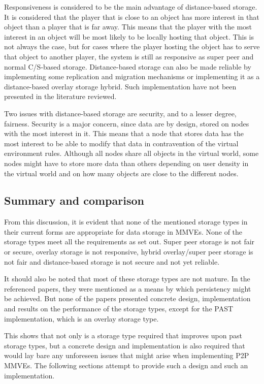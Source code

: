 \documentclass[10pt,a4paper,conference]{IEEEtran}
\begin{document}
Responsiveness is considered to be the main advantage of distance-based storage. It is considered that the player that is close to an object has more
interest in that object than a player that is far away. This means that the player with the most interest in an object will be most likely to be
locally hosting that object. This is not always the case, but for cases where the player hosting the object has to serve that object to another
player, the system is still as responsive as super peer and normal C/S-based storage. Distance-based storage can also be made reliable by
implementing some replication and migration mechanisms or implementing it as a distance-based overlay storage hybrid. Such implementation have not
been presented in the literature reviewed.

Two issues with distance-based storage are security, and to a lesser degree, fairness. Security is a major concern, since data are by design, stored
on nodes with the most interest in it. This means that a node that stores data has the most interest to be able to modify that data in contravention
of the virtual environment rules. Although all nodes share all objects in the virtual world, some nodes might have to store more data than others
depending on user density in the virtual world and on how many objects are close to the different nodes.

\subsection{Summary and comparison}

From this discussion, it is evident that none of the mentioned storage types in their current forms are appropriate for data storage in MMVEs. None
of the storage types meet all the requirements as set out. Super peer storage is not fair or secure, overlay storage is not responsive, hybrid
overlay/super peer storage is not fair and distance-based storage is not secure and not yet reliable.

It should also be noted that most of these storage types are not mature. In the referenced papers, they were mentioned as a means by which
persistency might be achieved. But none of the papers presented concrete design, implementation and results on the performance of the storage types,
except for the PAST implementation, which is an overlay storage type.

This shows that not only is a storage type required that improves upon past storage types, but a concrete design and implementation is also required
that would lay bare any unforeseen issues that might arise when implementing P2P MMVEs. The following sections attempt to provide such a design and
such an implementation.
\end{document}
